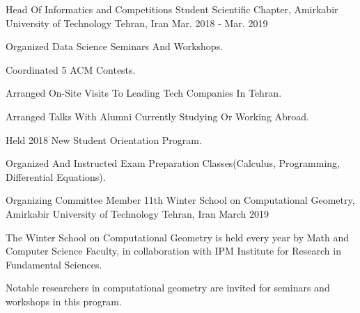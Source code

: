 \documentclass[11pt, a4paper]{awesome-cv}
\begin{document}
\begin{cventries}
	
	\cventry
	{Head Of Informatics and Competitions} %
	{Student Scientific Chapter, Amirkabir University of Technology} %
	{Tehran, Iran} %
	{Mar. 2018 - Mar. 2019} %
	{
		\begin{cvitems} %
			\item {Organized Data Science Seminars And Workshops.}
			\item {Coordinated 5 ACM Contests.}
			\item {Arranged On-Site Visits To Leading Tech Companies In Tehran.}
			\item {Arranged Talks With Alumni Currently Studying Or Working Abroad.}
			\item {Held 2018 New Student Orientation Program.}
			\item {Organized And Instructed Exam Preparation Classes(Calculus, Programming, Differential Equations).}
		\end{cvitems}
	}
	
	\cventry
	{Organizing Committee Member} %
	{11th Winter School on Computational Geometry, Amirkabir University of Technology} %
	{Tehran, Iran} %
	{March 2019} %
	{
		\begin{cvitems} %
			\item 	{The Winter School on Computational Geometry is held every year by Math and Computer Science Faculty, in collaboration with IPM Institute for Research in Fundamental Sciences.}
			\item {Notable researchers in computational geometry are invited for seminars and workshops in this program.}
		\end{cvitems}
	}
	
\end{cventries}
\end{document}
